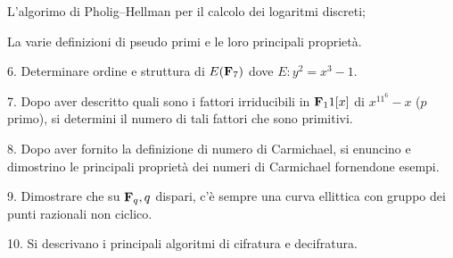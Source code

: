  L'algorimo di Pholig--Hellman per il calcolo dei logaritmi discreti; 
\vv

 La varie definizioni di pseudo primi e le loro principali propriet\`a.
\ve\vs

\item{6.} Determinare ordine e struttura di $E({\bf F}_7)$ dove $E: y^2=x^3-1$.\vv

\item{7.} Dopo aver descritto quali sono i fattori irriducibili in ${\bf F}_11[x]$ di $x^{11^6}-x$ ($p$ primo), 
si determini il numero di tali fattori che sono primitivi.\vv

\item{8.} Dopo aver fornito la definizione di numero di Carmichael, si enuncino e dimostrino le principali propriet\`a
dei numeri di Carmichael fornendone esempi.\ve \vs

\item{9.} Dimostrare che su ${\bf F}_q, q$ dispari, c'\`e sempre una curva ellittica con gruppo dei punti razionali non ciclico.
\vv\vv

\item{10.} Si descrivano i principali algoritmi di cifratura e decifratura.
\ \vst

 \bye
